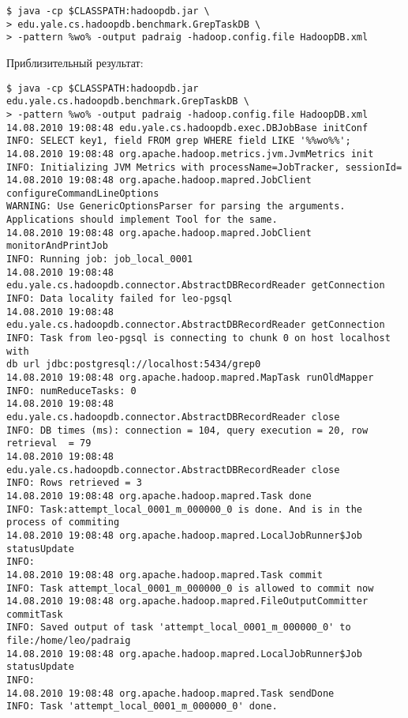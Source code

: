 \begin{lstlisting}[label=lst:haddop24,caption=Тестирование]
$ java -cp $CLASSPATH:hadoopdb.jar \
> edu.yale.cs.hadoopdb.benchmark.GrepTaskDB \
> -pattern %wo% -output padraig -hadoop.config.file HadoopDB.xml
\end{lstlisting}

Приблизительный результат:

\begin{lstlisting}[label=lst:haddop25,caption=Тестирование]
$ java -cp $CLASSPATH:hadoopdb.jar edu.yale.cs.hadoopdb.benchmark.GrepTaskDB \
> -pattern %wo% -output padraig -hadoop.config.file HadoopDB.xml
14.08.2010 19:08:48 edu.yale.cs.hadoopdb.exec.DBJobBase initConf
INFO: SELECT key1, field FROM grep WHERE field LIKE '%%wo%%';
14.08.2010 19:08:48 org.apache.hadoop.metrics.jvm.JvmMetrics init
INFO: Initializing JVM Metrics with processName=JobTracker, sessionId=
14.08.2010 19:08:48 org.apache.hadoop.mapred.JobClient configureCommandLineOptions
WARNING: Use GenericOptionsParser for parsing the arguments.
Applications should implement Tool for the same.
14.08.2010 19:08:48 org.apache.hadoop.mapred.JobClient monitorAndPrintJob
INFO: Running job: job_local_0001
14.08.2010 19:08:48 edu.yale.cs.hadoopdb.connector.AbstractDBRecordReader getConnection
INFO: Data locality failed for leo-pgsql
14.08.2010 19:08:48 edu.yale.cs.hadoopdb.connector.AbstractDBRecordReader getConnection
INFO: Task from leo-pgsql is connecting to chunk 0 on host localhost with
db url jdbc:postgresql://localhost:5434/grep0
14.08.2010 19:08:48 org.apache.hadoop.mapred.MapTask runOldMapper
INFO: numReduceTasks: 0
14.08.2010 19:08:48 edu.yale.cs.hadoopdb.connector.AbstractDBRecordReader close
INFO: DB times (ms): connection = 104, query execution = 20, row retrieval  = 79
14.08.2010 19:08:48 edu.yale.cs.hadoopdb.connector.AbstractDBRecordReader close
INFO: Rows retrieved = 3
14.08.2010 19:08:48 org.apache.hadoop.mapred.Task done
INFO: Task:attempt_local_0001_m_000000_0 is done. And is in the process of commiting
14.08.2010 19:08:48 org.apache.hadoop.mapred.LocalJobRunner$Job statusUpdate
INFO:
14.08.2010 19:08:48 org.apache.hadoop.mapred.Task commit
INFO: Task attempt_local_0001_m_000000_0 is allowed to commit now
14.08.2010 19:08:48 org.apache.hadoop.mapred.FileOutputCommitter commitTask
INFO: Saved output of task 'attempt_local_0001_m_000000_0' to file:/home/leo/padraig
14.08.2010 19:08:48 org.apache.hadoop.mapred.LocalJobRunner$Job statusUpdate
INFO:
14.08.2010 19:08:48 org.apache.hadoop.mapred.Task sendDone
INFO: Task 'attempt_local_0001_m_000000_0' done.

\end{lstlisting}
